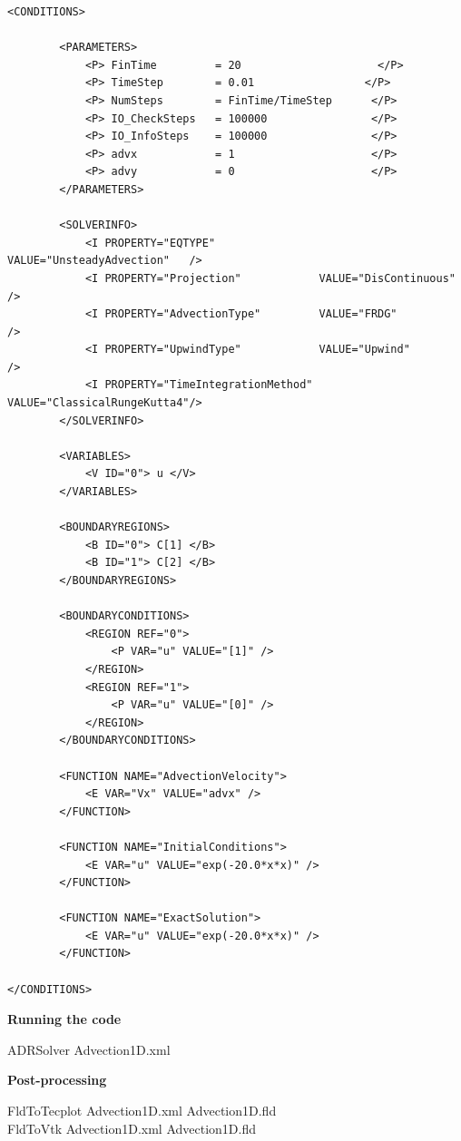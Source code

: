 \begin{lstlisting}[style=XMLStyle]
<CONDITIONS>
    
        <PARAMETERS>
            <P> FinTime         = 20                     </P>
            <P> TimeStep        = 0.01                 </P>
            <P> NumSteps        = FinTime/TimeStep      </P>
            <P> IO_CheckSteps   = 100000                </P>
            <P> IO_InfoSteps    = 100000                </P>
            <P> advx            = 1                     </P>
            <P> advy            = 0                     </P>
        </PARAMETERS>
        
        <SOLVERINFO>
            <I PROPERTY="EQTYPE"                VALUE="UnsteadyAdvection"   />
            <I PROPERTY="Projection"            VALUE="DisContinuous"       />
            <I PROPERTY="AdvectionType"         VALUE="FRDG"                />
            <I PROPERTY="UpwindType"            VALUE="Upwind"              />
            <I PROPERTY="TimeIntegrationMethod" VALUE="ClassicalRungeKutta4"/>
        </SOLVERINFO>

        <VARIABLES>
            <V ID="0"> u </V>
        </VARIABLES>

        <BOUNDARYREGIONS>
            <B ID="0"> C[1] </B>
            <B ID="1"> C[2] </B>
        </BOUNDARYREGIONS>

        <BOUNDARYCONDITIONS>
            <REGION REF="0">
                <P VAR="u" VALUE="[1]" />
            </REGION>
            <REGION REF="1">
                <P VAR="u" VALUE="[0]" />
            </REGION>
        </BOUNDARYCONDITIONS>

        <FUNCTION NAME="AdvectionVelocity">
            <E VAR="Vx" VALUE="advx" />
        </FUNCTION>
        
        <FUNCTION NAME="InitialConditions">
            <E VAR="u" VALUE="exp(-20.0*x*x)" />
        </FUNCTION>

        <FUNCTION NAME="ExactSolution">
            <E VAR="u" VALUE="exp(-20.0*x*x)" />
        </FUNCTION>

</CONDITIONS>
\end{lstlisting}

\textbf{Running the code}

ADRSolver Advection1D.xml

\textbf{Post-processing}

FldToTecplot Advection1D.xml Advection1D.fld \\

FldToVtk Advection1D.xml Advection1D.fld


